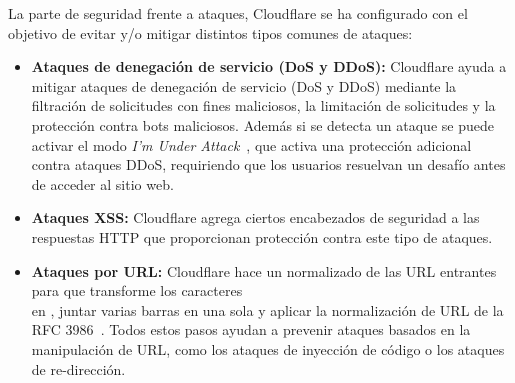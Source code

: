 La parte de seguridad frente a ataques, Cloudflare se ha configurado con el objetivo de evitar y/o mitigar distintos tipos comunes de ataques:
\begin{itemize}
    \item \textbf{Ataques de denegación de servicio (DoS y DDoS):} Cloudflare ayuda a mitigar ataques de denegación de servicio (DoS y DDoS) mediante la filtración de solicitudes con fines maliciosos, la limitación de solicitudes y la protección contra bots maliciosos. Además si se detecta un ataque se puede activar el modo \textit{I'm Under Attack}~\cite{CloudflareTeam2025}, que activa una protección adicional contra ataques DDoS, requiriendo que los usuarios resuelvan un desafío antes de acceder al sitio web.
    
    \item \textbf{Ataques XSS:} Cloudflare agrega ciertos encabezados de seguridad a las respuestas HTTP que proporcionan protección contra este tipo de ataques.

    \item \textbf{Ataques por URL:} Cloudflare hace un normalizado de las URL entrantes para que transforme los caracteres \\ en \/, juntar varias barras en una sola y aplicar la normalización de URL de la RFC 3986~\cite{CloudflareTeam2024}.    
    Todos estos pasos ayudan a prevenir ataques basados en la manipulación de URL, como los ataques de inyección de código o los ataques de re-dirección.
\end{itemize}

